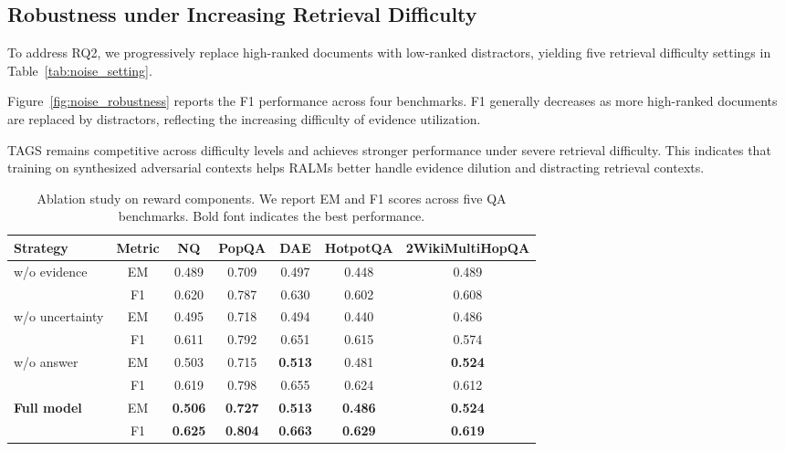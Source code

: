 \documentclass[11pt]{article}
\begin{document}
\subsection{Robustness under Increasing Retrieval Difficulty}

To address RQ2, we progressively replace high-ranked documents with low-ranked distractors, yielding five retrieval difficulty settings in Table~\ref{tab:noise_setting}.

Figure~\ref{fig:noise_robustness} reports the F1 performance across four benchmarks. 
F1 generally decreases as more high-ranked documents are replaced by distractors, reflecting the increasing difficulty of evidence utilization.

TAGS remains competitive across difficulty levels and achieves stronger performance under severe retrieval difficulty. 
This indicates that training on synthesized adversarial contexts helps RALMs better handle evidence dilution and distracting retrieval contexts.

\begin{table}[t]
  \caption{Ablation study on reward components. We report EM and F1 scores across five QA benchmarks. Bold font indicates the best performance.}
  \label{tab:reward_ablation}
  \centering
  \small
  \setlength{\tabcolsep}{12pt}
  \renewcommand{\arraystretch}{1.15}
  \begin{tabular}{@{}l c ccccc@{}}
  \toprule
  \textbf{Strategy} & \textbf{Metric} & \textbf{NQ} & \textbf{PopQA} & \textbf{DAE} & \textbf{HotpotQA} & \textbf{2WikiMultiHopQA} \\
  \midrule
  w/o evidence
   & EM & 0.489 & 0.709 & 0.497 & 0.448 & 0.489 \\
   & F1 & 0.620 & 0.787 & 0.630 & 0.602 & 0.608 \\
  \midrule
  w/o uncertainty
   & EM & 0.495 & 0.718 & 0.494 & 0.440 & 0.486 \\
   & F1 & 0.611 & 0.792 & 0.651 & 0.615 & 0.574 \\
  \midrule
  w/o answer
   & EM & 0.503 & 0.715 & \textbf{0.513} & 0.481 & \textbf{0.524} \\
   & F1 & 0.619 & 0.798 &0.655 & 0.624 & 0.612 \\
  \midrule
  \textbf{Full model}
   & EM & \textbf{0.506} & \textbf{0.727} & \textbf{0.513} & \textbf{0.486} & \textbf{0.524} \\
   & F1 & \textbf{0.625} & \textbf{0.804} & \textbf{0.663} & \textbf{0.629} & \textbf{0.619} \\
  \bottomrule
  \end{tabular}
\end{table}
\end{document}
